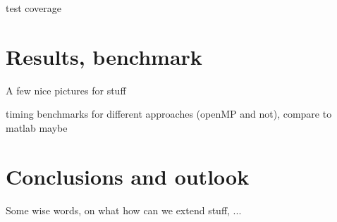 \documentclass[11pt]{scrartcl}
\begin{document}
test coverage


\section{Results, benchmark}
A few nice pictures for stuff

timing benchmarks for different approaches (openMP and not), compare to matlab maybe


\section{Conclusions and outlook}
Some wise words, on what how can we extend stuff, ...


%
\end{document}
